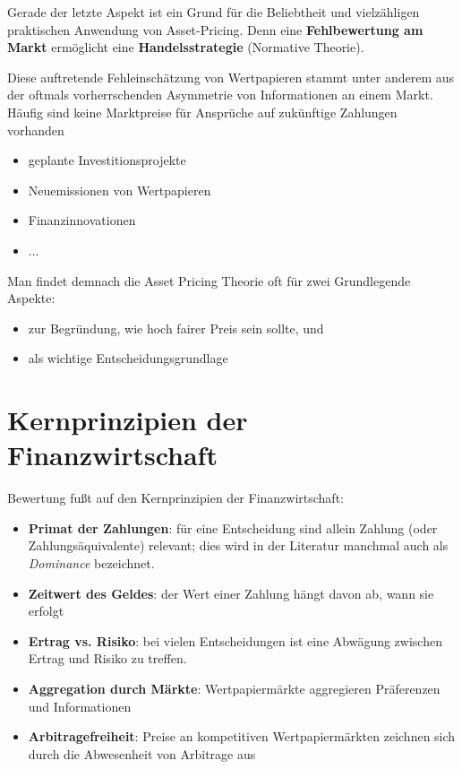\documentclass[12pt]{extreport} %
\theoremstyle{named}
\theoremstyle{nnamed}
\theoremstyle{itshape}
\theoremstyle{normal}
\begin{document}
Gerade der letzte Aspekt ist ein Grund für die Beliebtheit und vielzähligen praktischen Anwendung von Asset-Pricing. Denn eine \textbf{Fehlbewertung am Markt} ermöglicht eine \textbf{Handelsstrategie} (Normative Theorie). ~\bigskip

Diese auftretende Fehleinschätzung von Wertpapieren stammt unter anderem aus der oftmals vorherrschenden Asymmetrie von Informationen an einem Markt. Häufig sind keine Marktpreise für Ansprüche auf zukünftige Zahlungen vorhanden
\begin{itemize}
	\item geplante Investitionsprojekte
	\item Neuemissionen von Wertpapieren
	\item Finanzinnovationen
	\item $\dotsc$
\end{itemize}

Man findet demnach die Asset Pricing Theorie oft für zwei Grundlegende Aspekte:
\begin{itemize}
	\item zur Begründung, wie hoch fairer Preis sein sollte, und
	\item als wichtige Entscheidungsgrundlage
\end{itemize}

\section{Kernprinzipien der Finanzwirtschaft}
Bewertung fußt auf den Kernprinzipien der Finanzwirtschaft:
\begin{itemize}
	\item \textbf{Primat der Zahlungen}: für eine Entscheidung sind allein Zahlung (oder Zahlungsäquivalente) relevant; dies wird in der Literatur manchmal auch als \textit{Dominance} bezeichnet.
	\item \textbf{Zeitwert des Geldes}: der Wert einer Zahlung hängt davon ab, wann sie erfolgt
	\item \textbf{Ertrag vs. Risiko}: bei vielen Entscheidungen ist eine Abwägung zwischen Ertrag und Risiko zu treffen.
	\item \textbf{Aggregation durch Märkte}: Wertpapiermärkte aggregieren Präferenzen und Informationen
	\item \textbf{Arbitragefreiheit}: Preise an kompetitiven Wertpapiermärkten zeichnen sich durch die Abwesenheit von Arbitrage aus
\end{itemize}
\end{document}
